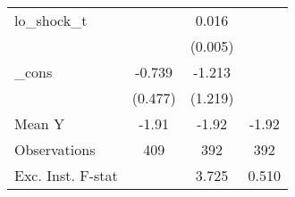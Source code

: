 {\begin{tabular}{l*{3}{c}}
\addlinespace
lo\_shock\_t  &                     &       0.016\sym{***}&                     \\
            &                     &     (0.005)         &                     \\
\addlinespace
\_cons      &      -0.739         &      -1.213         &                     \\
            &     (0.477)         &     (1.219)         &                     \\
\midrule
Mean Y      &       -1.91         &       -1.92         &       -1.92         \\
Observations&         409         &         392         &         392         \\
Exc. Inst. F-stat&                     &       3.725         &       0.510         \\
\bottomrule
\end{tabular}
}
